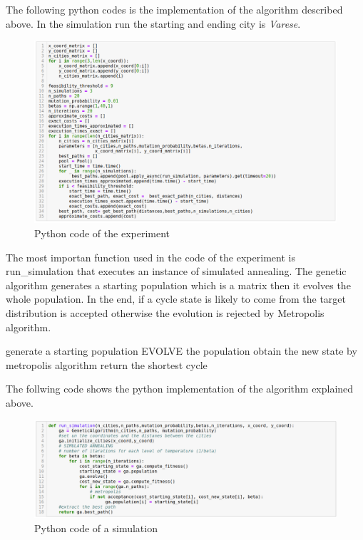 \documentclass{article}
\begin{document}
\noindent The following python codes is the implementation of the algorithm described above. In the simulation run the starting and ending city is \textit{Varese}. \\
\begin{figure}[H]
\includegraphics[scale=0.5]{simulation.png} 
\centering
\caption{Python code of the experiment}
\end{figure}

\noindent The most importan function used in the code of the experiment is run\_simulation that executes an instance of simulated annealing. The genetic algorithm generates a starting population which is a matrix then it evolves the whole population. In the end, if a cycle state is likely to come from the target distribution is accepted otherwise the evolution is rejected by Metropolis algorithm.

\begin{algorithm}[H]
    \begin{algorithmic}[1]
      \State generate a starting population
       		\State EVOLVE the population
       		\State obtain the new state by metropolis algorithm
       	\EndFor 
       \EndFor
       \State return the shortest cycle
       \EndFunction
\end{algorithmic}
\end{algorithm}

\noindent The follwing code shows the python implementation of the algorithm explained above.
\begin{figure}[H]
\includegraphics[scale=0.38]{run_simulation.png} 
\centering
\caption{Python code of a simulation}
\end{figure}
\noindent
\end{document}
